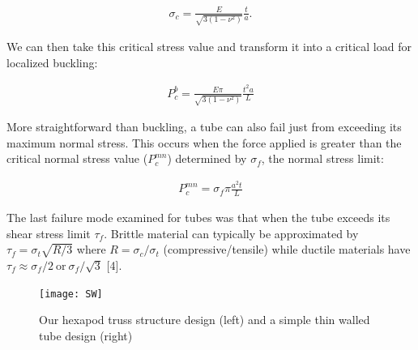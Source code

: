 \documentclass[final]{svjour2}
\begin{document}
\begin{eqnarray}
\sigma_{c}=\frac{E}{\sqrt{3(1-\nu^2)}}\frac{t}{a}.
\end{eqnarray}

We can then take this critical stress value and transform it into a critical load for localized buckling:

\begin{eqnarray}
P_{c}^{b} = \frac{E \pi}{\sqrt{3(1-\nu^2)}}\frac{t^2a}{L}
\end{eqnarray}

More straightforward than buckling, a tube can also fail just from exceeding its maximum normal stress. This occurs when the force applied is greater than the critical normal stress value ($P_{c}^{mn}$) determined by $\sigma_{f}$, the normal stress limit:

\begin{eqnarray}
P_{c}^{mn} = \sigma_{f} \pi \frac{a^2t}{L}
\end{eqnarray}

The last failure mode examined for tubes was that when the tube exceeds its shear stress limit $\tau_{f}$. Brittle material can typically be approximated by $\tau_{f} = \sigma_{t}\sqrt{R/3} $ where $R = \sigma_{c}/\sigma_{t}$ (compressive/tensile) while ductile materials have $\tau_{f} \approx \sigma_{f}/2 \ \text{or} \ \sigma_{f}/\sqrt{3}$ [4].

\begin{figure}[!ht]
\begin{center}
\texttt{[image: SW]}
\end{center}
\caption{Our hexapod truss structure design (left) and a simple thin walled tube design (right)}
\label{SW}
\end{figure}
\end{document}
